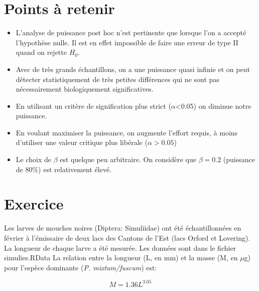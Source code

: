 \documentclass[12pt,]{book}
\makeatletter
\providecommand{\tightlist}{%
  \setlength{\itemsep}{0pt}\setlength{\parskip}{0pt}}
\newenvironment{kframe}{%
\medskip{}
\setlength{\fboxsep}{.8em}
 \def\at@end@of@kframe{}%
 \ifinner\ifhmode%
  \def\at@end@of@kframe{\end{minipage}}%
  \begin{minipage}{\columnwidth}%
 \fi\fi%
 \def\FrameCommand##1{\hskip\@totalleftmargin \hskip-\fboxsep
 \colorbox{shadecolor}{##1}\hskip-\fboxsep
     \hskip-\linewidth \hskip-\@totalleftmargin \hskip\columnwidth}%
 \MakeFramed {\advance\hsize-\width
   \@totalleftmargin\z@ \linewidth\hsize
   \@setminipage}}%
 {\par\unskip\endMakeFramed%
 \at@end@of@kframe}
\newenvironment{rmdblock}[1]
  {
  \begin{itemize}
  \renewcommand{\labelitemi}{
    \raisebox{-.7\height}[0pt][0pt]{
      {\setkeys{Gin}{width=3em,keepaspectratio}\texttt{[image: images/\#1]}}
    }
  }
  \setlength{\fboxsep}{1em}
  \begin{kframe}
  \item
  }
  {
  \end{kframe}
  \end{itemize}
  }
\newenvironment{rmdcode}
  {\begin{rmdblock}{screen}}
  {\end{rmdblock}}
\makeatother
\begin{document}
\hypertarget{points-uxe0-retenir}{%
\section{Points à retenir}\label{points-uxe0-retenir}}

\begin{itemize}
\tightlist
\item
  L'analyse de puissance post hoc n'est pertinente que lorsque l'on a accepté l'hypothèse nulle.
  Il est en effet impossible de faire une erreur de type II quand on rejette \(H_0\).
\item
  Avec de très grands échantillons, on a une puissance quasi infinie et on peut détecter statistiquement de très petites différences qui ne sont pas nécessairement biologiquement significatives.
\item
  En utilisant un critère de signification plus strict (\(\alpha\)\textless{}0.05) on diminue notre puissance.
\item
  En voulant maximiser la puissance, on augmente l'effort requis, à moins d'utiliser une valeur critique plus libérale (\(\alpha>0.05\))
\item
  Le choix de \(\beta\) est quelque peu arbitraire.
  On considère que \(\beta=0.2\) (puissance de 80\%) est relativement élevé.
\end{itemize}

\hypertarget{ex-power}{%
\section{Exercice}\label{ex-power}}

\begin{rmdcode}
\end{rmdcode}

Les larves de mouches noires (Diptera: Simuliidae) ont été échantillonnées en février à l'émissaire de deux lacs des Cantons de l'Est (lacs Orford et Lovering).
La longueur de chaque larve a été mesurée.
Les données sont dans le fichier simulies.RData La relation entre la longueur (L, en mm) et la masse (M, en \(\mu\)g) pour l'espèce dominante (\emph{P. mixtum/fuscum}) est:

\[
M = 1.36 L^3.05
\]
\end{document}
